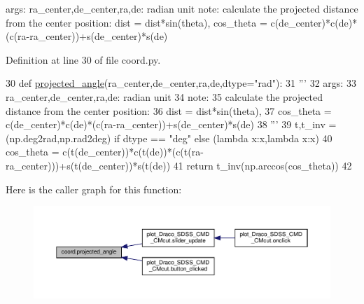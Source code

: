 \begin{DoxyVerb}args:
    ra_center,de_center,ra,de: radian unit
note:
    calculate the projected distance from the center position:
    dist = dist*sin(theta),
    cos_theta = c(de_center)*c(de)*(c(ra-ra_center))+s(de_center)*s(de)
\end{DoxyVerb}
 

Definition at line 30 of file coord.\+py.


\begin{DoxyCode}
30 \textcolor{keyword}{def }\hyperlink{namespacecoord_a04a9b47f67924315930327ed806ee648}{projected\_angle}(ra\_center,de\_center,ra,de,dtype="rad"):
31     \textcolor{stringliteral}{'''}
32 \textcolor{stringliteral}{    args:}
33 \textcolor{stringliteral}{        ra\_center,de\_center,ra,de: radian unit}
34 \textcolor{stringliteral}{    note:}
35 \textcolor{stringliteral}{        calculate the projected distance from the center position:}
36 \textcolor{stringliteral}{        dist = dist*sin(theta),}
37 \textcolor{stringliteral}{        cos\_theta = c(de\_center)*c(de)*(c(ra-ra\_center))+s(de\_center)*s(de)}
38 \textcolor{stringliteral}{    '''}
39     t,t\_inv = (np.deg2rad,np.rad2deg) \textcolor{keywordflow}{if} dtype == \textcolor{stringliteral}{"deg"} \textcolor{keywordflow}{else} (\textcolor{keyword}{lambda} x:x,\textcolor{keyword}{lambda} x:x)
40     cos\_theta = c(t(de\_center))*c(t(de))*(c(t(ra-ra\_center)))+s(t(de\_center))*s(t(de))
41     \textcolor{keywordflow}{return} t\_inv(np.arccos(cos\_theta))
42 
\end{DoxyCode}
Here is the caller graph for this function\+:\nopagebreak
\begin{figure}[H]
\begin{center}
\leavevmode
\includegraphics[width=350pt]{d2/df4/namespacecoord_a04a9b47f67924315930327ed806ee648_icgraph}
\end{center}
\end{figure}
\mbox{\label{namespacecoord_a46aebc3089e078f4597812fecdd0975f}} 
